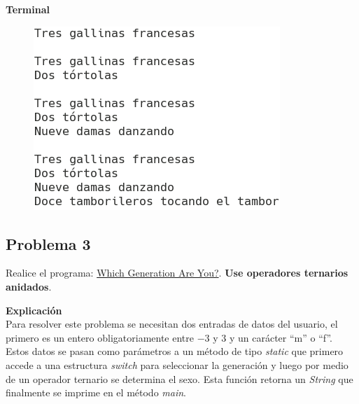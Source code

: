 \documentclass[11pt, twocolumn]{article}
\begin{document}
  \textbf{Terminal}
  \begin{figure}[ht]
    \includegraphics[width=0.55\columnwidth, center]{P2B.png}
  \end{figure}

  \subsection*{Problema 3}
  Realice el programa:  \href{https://edabit.com/challenge/48EJWLhF224na8po3}{Which Generation Are You?}. \textbf{Use operadores ternarios anidados}.

  \textbf{Explicación} \\
  Para resolver este problema se necesitan dos entradas de datos del usuario, el primero es un entero obligatoriamente entre $-3$ y $3$ y un carácter ``m'' o ``f''. Estos datos se pasan como parámetros a un método de tipo \textit{static} que primero accede a una estructura \textit{switch} para seleccionar la generación y luego por medio de un operador ternario se determina el sexo. Esta función retorna un \textit{String} que finalmente se imprime en el método \textit{main}.
\end{document}
